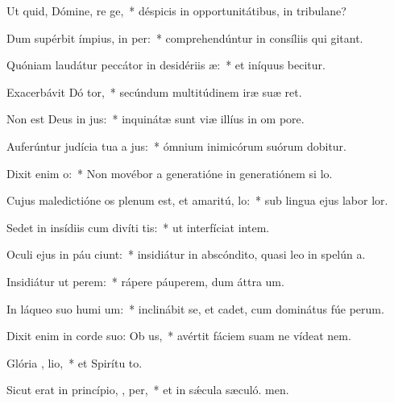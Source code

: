 \item Ut quid, Dómine, re ge,~* déspicis in opportunitátibus, in tribulane?
\item Dum supérbit ímpius, in per:~* comprehendúntur in consíliis qui gitant.
\item Quóniam laudátur peccátor in desidériis  æ:~* et iníquus becitur.
\item Exacerbávit Dó tor,~* secúndum multitúdinem iræ suæ  ret.
\item Non est Deus in  jus:~* inquinátæ sunt viæ illíus in om pore.
\item Auferúntur judícia tua a  jus:~* ómnium inimicórum suórum dobitur.
\item Dixit enim   o:~* Non movébor a generatióne in generatiónem si lo.
\item Cujus maledictióne os plenum est, et amaritú,  lo:~* sub lingua ejus labor  lor.
\item Sedet in insídiis cum divíti  tis:~* ut interfíciat intem.
\item Oculi ejus in páu ciunt:~* insidiátur in abscóndito, quasi leo in spelún a.
\item Insidiátur ut  perem:~* rápere páuperem, dum áttra um.
\item In láqueo suo humi um:~* inclinábit se, et cadet, cum dominátus fúe perum.
\item Dixit enim in corde suo: Ob  us,~* avértit fáciem suam ne vídeat  nem.
\item Glória ,  lio,~* et Spirítu to.
\item Sicut erat in princípio,  ,  per,~* et in sǽcula sæculó. men.
